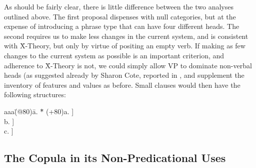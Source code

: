 As should be fairly clear, there is little difference between the two
analyses outlined above. The first proposal dispenses with null
categories, but at the expense of introducing a phrase type that can
have four different heads. The second requires us to make less changes
in the current system, and is consistent with \={X}-Theory, but only by
virtue of positing an empty verb.  If making as few changes to the
current system as possible is an important criterion, and adherence to
\={X}-Theory is not, we could simply allow VP to dominate non-verbal
heads (as suggested already by Sharon Cote, reported in \cite{za89}, and
supplement the inventory of features and values as before.  Small
clauses would then have the following structures:
\begin{tabbing}
aaa\=(@80)\=a. \= *\= \kill
   \>(+80)\>a. \>  \> [$_{S}$ NP [$_{VP}$  A \ldots ]]  \\
   \>     \>b. \>  \> [$_{S}$ NP [$_{VP}$  N \ldots ]]  \\
   \>     \>c. \>  \> [$_{S}$ NP [$_{VP}$  P \ldots ]]
\end{tabbing}

\subsection{The Copula in its Non-Predicational Uses}

